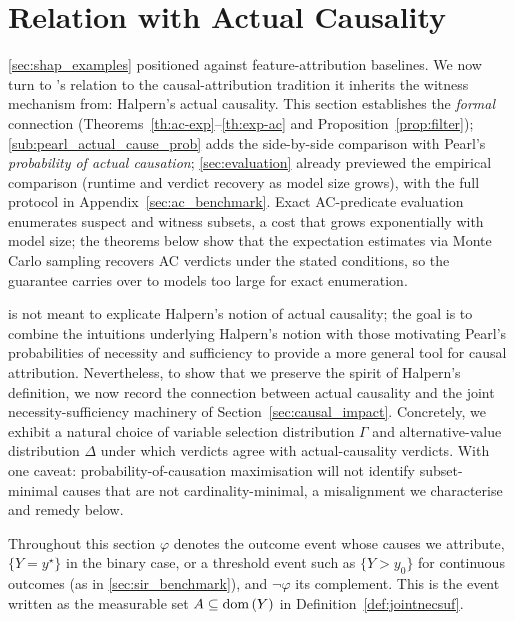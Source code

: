 \section{Relation with Actual Causality} \label{sec:relation_with_ac}

 \cref{sec:shap_examples} positioned \ourapproach against feature-attribution
baselines. We now turn to \ourapproach's relation to the causal-attribution
tradition it inherits the witness mechanism from: Halpern's actual causality.
This section establishes the \emph{formal} connection
(Theorems~\ref{th:ac-exp}--\ref{th:exp-ac} and Proposition~\ref{prop:filter});
\cref{sub:pearl_actual_cause_prob} adds the side-by-side comparison with Pearl's
\emph{probability of actual causation}; \cref{sec:evaluation} already previewed
the empirical comparison (runtime and verdict recovery as model size grows), with
the full protocol in Appendix~\ref{sec:ac_benchmark}. Exact AC-predicate evaluation
enumerates suspect and witness subsets, a cost that grows exponentially with model
size; the theorems below show that the expectation \ourapproach{} estimates via
Monte Carlo sampling recovers AC verdicts under the stated conditions, so the
guarantee carries over to models too large for exact enumeration.

\ourapproach{} is not meant to explicate Halpern's notion of actual causality; the goal
is to combine the intuitions underlying Halpern's notion with those motivating Pearl's
probabilities of necessity and sufficiency to provide a more general tool for causal
attribution. Nevertheless, to show that we preserve the spirit of Halpern's definition,
we now record the connection between actual causality and the joint necessity-sufficiency
machinery of Section~\ref{sec:causal_impact}. Concretely, we exhibit a
natural choice of variable selection distribution $\Gamma$ and alternative-value
distribution $\Delta$ under which \ourapproach{} verdicts agree with actual-causality
verdicts. With one caveat: probability-of-causation maximisation will not identify
subset-minimal causes that are not cardinality-minimal, a misalignment we
characterise and remedy below.

\medskip\noindent Throughout this section $\varphi$ denotes the outcome event whose
causes we attribute, $\{Y=y^\star\}$ in the binary case, or a threshold event such
as $\{Y>y_0\}$ for continuous outcomes (as in \cref{sec:sir_benchmark}), and
$\neg\varphi$ its complement. This is the event written as the measurable set
$A\subseteq\operatorname{dom}\,(Y)$ in Definition~\ref{def:jointnecsuf}.

